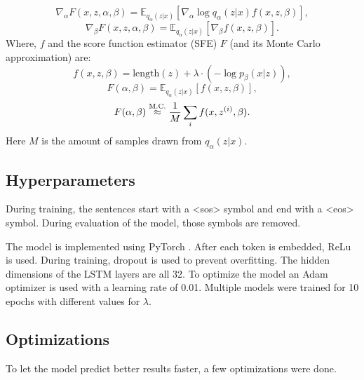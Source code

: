 \begin{equation}
    \label{eq:gradient_alpha}
    \nabla_\alpha F(x, z, \alpha, \beta) = \mathbb{E}_{q_{\alpha}(z|x)} [\nabla_{\alpha} \log q_{\alpha}(z|x) f(x, z, \beta)],
\end{equation}
\begin{equation}
    \label{eq:gradient_beta}
    \nabla_\beta F(x, z, \alpha, \beta) = \mathbb{E}_{q_{\alpha}(z|x)} [\nabla_{\beta} f (x, z, \beta)].
\end{equation}
Where, $f$ and the score function estimator (SFE) $F$ (and its Monte Carlo approximation) are:
\begin{equation}
    \label{eq:f}
    f(x, z, \beta) = \text{length}(z) + \lambda \cdot (-\log p_{\beta}(x|z)),
\end{equation}
\begin{equation}
    \label{eq:F}
    F (\alpha, \beta) = \mathbb{E}_{q_{\alpha}(z|x)} [f(x, z, \beta)],
\end{equation}
\begin{equation}
    \label{eq:F_approx}
    F (\alpha, \beta) \stackrel{\text{M.C.}}{\approx} \frac{1}{M} \sum_i f (x, z^{(i)}, \beta).
\end{equation}
Here $M$ is the amount of samples drawn from $q_{\alpha}(z|x)$.

\subsection{Hyperparameters}
\label{sec:hyper}
During training, the sentences start with a <sos> symbol and end with a <eos> symbol.
During evaluation of the model, those symbols are removed.

The model is implemented using PyTorch .
After each token is embedded, ReLu is used. During training, dropout is used to prevent overfitting. 
The hidden dimensions of the LSTM layers are all 32. 
To optimize the model an Adam optimizer  is used with a learning rate of 0.01. 
Multiple models were trained for 10 epochs with different values for $\lambda$.

\subsection{Optimizations}
\label{sec:optimizations}
To let the model predict better results faster, a few optimizations were done.

